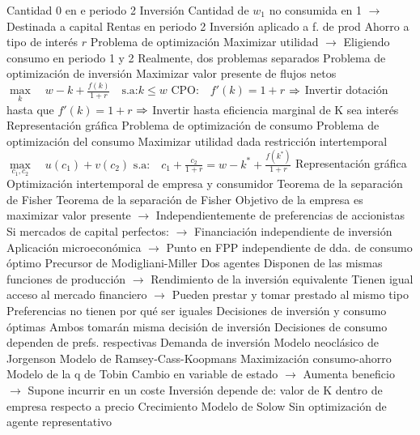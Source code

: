 \documentclass{nuevotema}
\begin{document}
\begin{esquemal}
				\4[] Cantidad 0 en e periodo 2
				\4 Inversión
				\4[] Cantidad de $w_1$ no consumida en 1
				\4[] $\to$ Destinada a capital
				\4 Rentas en periodo 2
				\4[] Inversión aplicado a f. de prod
				\4[] Ahorro a tipo de interés $r$
				\4 Problema de optimización
				\4[] Maximizar utilidad
				\4[] $\to$ Eligiendo consumo en periodo 1 y 2
				\4 Realmente, dos problemas separados
				\4[I] Problema de optimización de inversión
				\4[] Maximizar valor presente de flujos netos
				\4[] $\underset{k}{\max} \quad w-k + \frac{f(k)}{1+r} \quad \text{s.a:} k \leq w$
				\4[] $\text{CPO:} \quad f'(k) = 1+r$
				\4[] $\then$ Invertir dotación hasta que $f'(k) = 1+r$
				\4[] $\then$ Invertir hasta eficiencia marginal de K sea interés
				\4[] Representación gráfica
				\4[] 
				\4[II] Problema de optimización de consumo
				\4 Problema de optimización del consumo
				\4[] Maximizar utilidad dada restricción intertemporal
				\4[] $\underset{c_1, c_2}{\max} \quad u(c_1) + v(c_2)$
				\4[] $\text{s.a:} \quad c_1 + \frac{c_2}{1+r} = w -k^* + \frac{f(k^*)}{1+r}$
				\4[] Representación gráfica
				\4[] 
				\4 Optimización intertemporal de empresa y consumidor
				\4[$\then$] Teorema de la separación de Fisher
			\3 Teorema de la separación de Fisher
				\4 Objetivo de la empresa es maximizar valor presente
				\4[] $\to$ Independientemente de preferencias de accionistas
				\4 Si mercados de capital perfectos:
				\4[] $\to$ Financiación independiente de inversión
				\4 Aplicación microeconómica
				\4[] $\to$ Punto en FPP independiente de dda. de consumo óptimo
				\4 Precursor de Modigliani-Miller
				\4 Dos agentes
				\4[] Disponen de las mismas funciones de producción
				\4[] $\to$ Rendimiento de la inversión equivalente
				\4[] Tienen igual acceso al mercado financiero
				\4[] $\to$ Pueden prestar y tomar prestado al mismo tipo
				\4[] Preferencias no tienen por qué ser iguales
				\4 Decisiones de inversión y consumo óptimas
				\4[] Ambos tomarán misma decisión de inversión
				\4[] Decisiones de consumo dependen de prefs. respectivas
			\3 Demanda de inversión
				\4 Modelo neoclásico de Jorgenson
				\4 Modelo de Ramsey-Cass-Koopmans
				\4[] Maximización consumo-ahorro
				\4 Modelo de la q de Tobin
				\4[] Cambio en variable de estado
				\4[] $\to$ Aumenta beneficio
				\4[] $\to$ Supone incurrir en un coste
				\4[] Inversión depende de:
				\4[] valor de K dentro de empresa respecto a precio
			\3 Crecimiento
				\4 Modelo de Solow
				\4[] Sin optimización de agente representativo

\end{esquemal}
\end{document}
